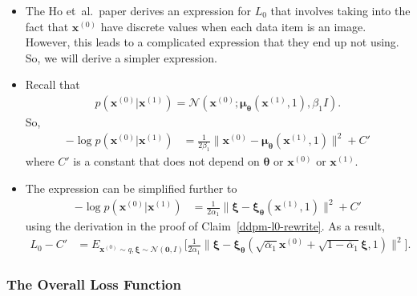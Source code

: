 \documentclass[10pt]{article}
\newcommand{\ve}[1]{\mathbf{#1}}
\newcommand{\ves}[1]{\boldsymbol{#1}}
\newcommand{\etal}{{et~al.}}
\newcommand{\mcal}[1]{\mathcal{#1}}
\begin{document}
\begin{itemize}
\item The Ho \etal\ paper derives an expression for $L_0$ that involves taking into the fact that $\ve{x}^{(0)}$ have discrete values when each data item is an image. However, this leads to a complicated expression that they end up not using. So, we will derive a simpler expression.

\item Recall that
\begin{align*}
  p(\ve{x}^{(0)}|\ve{x}^{(1)}) = \mcal{N}(\ve{x}^{(0)}; \ves{\mu}_{\ves{\theta}}(\ve{x}^{(1)}, 1), \beta_1 I ).
\end{align*}
So,
\begin{align*}
  - \log p(\ve{x}^{(0)}|\ve{x}^{(1)})
  &= \frac{1}{2\beta_1} \big\| \ve{x}^{(0)} - \ves{\mu}_{\ves{\theta}}(\ve{x}^{(1)}, 1) \big\|^2 + C'
\end{align*}
where $C'$ is a constant that does not depend on $\ves{\theta}$ or $\ve{x}^{(0)}$ or $\ve{x}^{(1)}$. 

\item The expression can be simplified further to
\begin{align*}
  - \log p(\ve{x}^{(0)}|\ve{x}^{(1)})  
  &= \frac{1}{2\alpha_1} \big\| \ves{\xi} - \ves{\xi}_{\ves{\theta}}(\ve{x}^{(1)},1) \big\|^2 + C'
\end{align*}
using the derivation in the proof of Claim~\ref{ddpm-l0-rewrite}. As a result,
\begin{align*}
  L_0 - C' 
  &= E_{\ve{x}^{(0)} \sim q, \ves{\xi} \sim \mcal{N}(\ve{0}, I)} \bigg[ \frac{1}{2\alpha_1} \Big\| \ves{\xi} - \ves{\xi}_{\ves{\theta}}(\sqrt{\overline{\alpha}_1}\ve{x}^{(0)} + \sqrt{1 - \overline{\alpha}_1} \ves{\xi}, 1 ) \Big\|^2 \bigg].
\end{align*}
\end{itemize}

\subsubsection{The Overall Loss Function}
\end{document}

